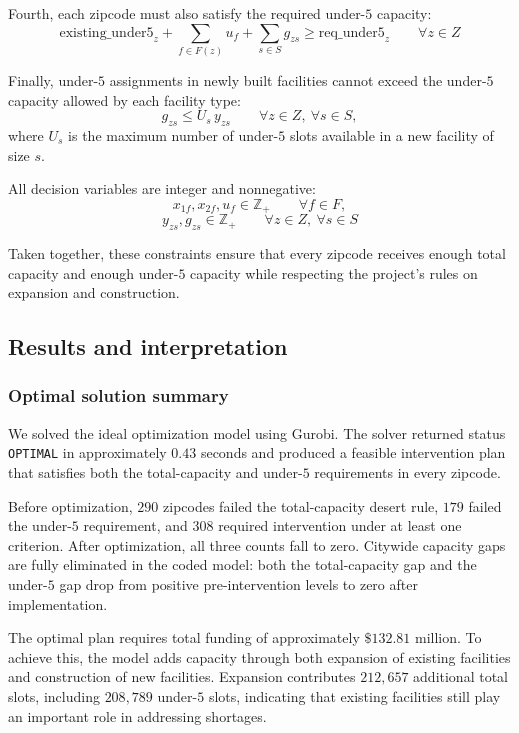 \documentclass[11pt]{article}
\newcommand{\1}{\mathbb{I}}
\begin{document}
Fourth, each zipcode must also satisfy the required under-\(5\) capacity:
\[
\mathrm{existing\_under5}_z
+
\sum_{f \in F(z)} u_f
+
\sum_{s \in S} g_{zs}
\ge
\mathrm{req\_under5}_z
\qquad \forall z \in Z
\]

Finally, under-\(5\) assignments in newly built facilities cannot exceed the under-\(5\) capacity allowed by each facility type:
\[
g_{zs} \le U_s\, y_{zs}
\qquad \forall z \in Z,\ \forall s \in S,
\]
where \(U_s\) is the maximum number of under-\(5\) slots available in a new facility of size \(s\).

All decision variables are integer and nonnegative:
\[
x_{1f}, x_{2f}, u_f \in \mathbb{Z}_+
\qquad \forall f \in F,
\]
\[
y_{zs}, g_{zs} \in \mathbb{Z}_+
\qquad \forall z \in Z,\ \forall s \in S
\]

Taken together, these constraints ensure that every zipcode receives enough total capacity and enough under-\(5\) capacity while respecting the project’s rules on expansion and construction.

\subsection{Results and interpretation}

\subsubsection{Optimal solution summary}

We solved the ideal optimization model using Gurobi. The solver returned status \texttt{OPTIMAL} in approximately \(0.43\) seconds and produced a feasible intervention plan that satisfies both the total-capacity and under-\(5\) requirements in every zipcode.

Before optimization, \(290\) zipcodes failed the total-capacity desert rule, \(179\) failed the under-\(5\) requirement, and \(308\) required intervention under at least one criterion. After optimization, all three counts fall to zero. Citywide capacity gaps are fully eliminated in the coded model: both the total-capacity gap and the under-\(5\) gap drop from positive pre-intervention levels to zero after implementation.

The optimal plan requires total funding of approximately \(\$132.81\) million. To achieve this, the model adds capacity through both expansion of existing facilities and construction of new facilities. Expansion contributes \(212{,}657\) additional total slots, including \(208{,}789\) under-\(5\) slots, indicating that existing facilities still play an important role in addressing shortages.
\end{document}
